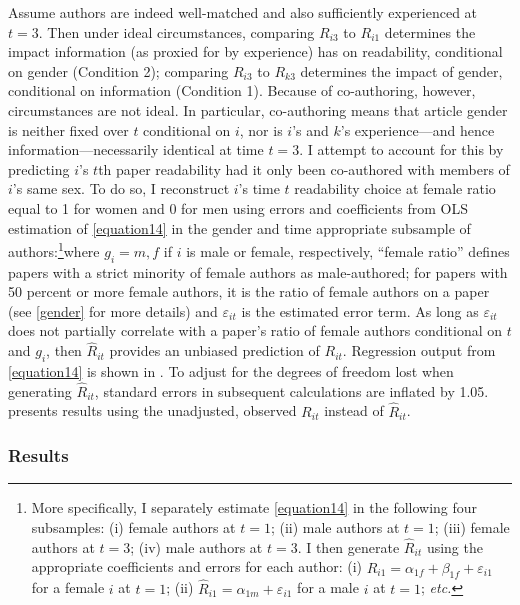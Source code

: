 Assume authors are indeed well-matched and also sufficiently experienced at $t=3$. Then under ideal circumstances, comparing $R_{i3}$ to $R_{i1}$ determines the impact information (as proxied for by experience) has on readability, conditional on gender (Condition 2); comparing $R_{i3}$ to $R_{k3}$ determines the impact of gender, conditional on information (Condition 1). Because of co-authoring, however, circumstances are not ideal. In particular, co-authoring means that article gender is neither fixed over $t$ conditional on $i$, nor is $i$'s and $k$'s experience---and hence information---necessarily identical at time $t=3$. I attempt to account for this by predicting $i$'s $t$th paper readability had it only been co-authored with members of $i$'s same sex. To do so, I reconstruct $i$'s time $t$ readability choice at female ratio equal to 1 for women and 0 for men using errors and coefficients from OLS estimation of \autoref{equation14} in the gender and time appropriate subsample of authors:\footnote{More specifically, I separately estimate \autoref{equation14} in the following four subsamples: (i) female authors at $t=1$; (ii) male authors at $t=1$; (iii) female authors at $t=3$; (iv) male authors at $t=3$. I then generate $\widehat R_{it}$ using the appropriate coefficients and errors for each author: (i) $\widehat R_{i1}=\alpha_{1f}+\beta_{1f}+\varepsilon_{i1}$ for a female $i$ at $t=1$; (ii) $\widehat R_{i1}=\alpha_{1m}+\varepsilon_{i1}$ for a male $i$ at $t=1$; \emph{etc.}}where $g_i=m,f$ if $i$ is male or female, respectively, ``female ratio'' defines papers with a strict minority of female authors as male-authored; for papers with 50 percent or more female authors, it is the ratio of female authors on a paper (see \autoref{gender} for more details) and $\varepsilon_{it}$ is the estimated error term. As long as $\varepsilon_{it}$ does not partially correlate with a paper's ratio of female authors conditional on $t$ and $g_i$, then $\widehat R_{it}$ provides an unbiased prediction of $R_{it}$. Regression output from \autoref{equation14} is shown in . To adjust for the degrees of freedom lost when generating $\widehat R_{it}$, standard errors in subsequent calculations are inflated by 1.05.  presents results using the unadjusted, observed $R_{it}$ instead of $\widehat R_{it}$.

\subsubsection{Results}
\label{matchingresults}

